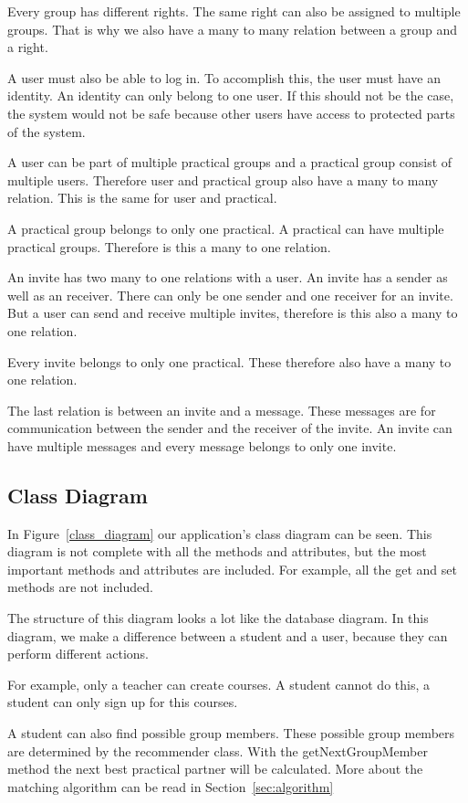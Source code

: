 Every group has different rights.
The same right can also be assigned to multiple groups.
That is why we also have a many to many relation between a group and a right.

A user must also be able to log in.
To accomplish this, the user must have an identity.
An identity can only belong to one user.
If this should not be the case, the system would not be safe because other users have access to protected parts of the system.

A user can be part of multiple practical groups and a practical group consist of multiple users.
Therefore user and practical group also have a many to many relation.
This is the same for user and practical.

A practical group belongs to only one practical.
A practical can have multiple practical groups.
Therefore is this a many to one relation.

An invite has two many to one relations with a user.
An invite has a sender as well as an receiver.
There can only be one sender and one receiver for an invite.
But a user can send and receive multiple invites, therefore is this also a many to one relation.

Every invite belongs to only one practical.
These therefore also have a many to one relation.

The last relation is between an invite and a message.
These messages are for communication between the sender and the receiver of the invite.
An invite can have multiple messages and every message belongs to only one invite.

\subsection{Class Diagram}
In Figure~\ref{class_diagram} our application's class diagram can be seen.
This diagram is not complete with all the methods and attributes, but the most important methods and attributes are included.
For example, all the get and set methods are not included.

The structure of this diagram looks a lot like the database diagram.
In this diagram, we make a difference between a student and a user, because they can perform different actions.

For example, only a teacher can create courses.
A student cannot do this, a student can only sign up for this courses.

A student can also find possible group members.
These possible group members are determined by the recommender class.
With the getNextGroupMember method the next best practical partner will be calculated.
More about the matching algorithm can be read in Section~\ref{sec:algorithm}

